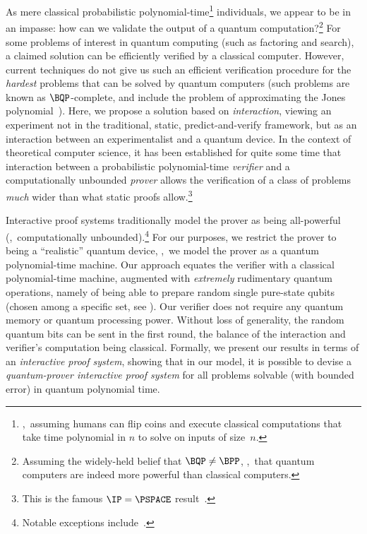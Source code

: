 \documentclass{toc}
\begin{document}
As mere classical probabilistic polynomial-time\footnote{\Ie,~assuming humans can flip coins and execute classical computations that take time polynomial in $n$ to solve on inputs of size~$n$.} individuals, we appear to be in an impasse: how can we validate the output of a quantum computation?\footnote{Assuming the widely-held belief that $\BQP \neq \BPP $, \ie,~that quantum computers are indeed more powerful than classical computers.}
For some problems of interest in quantum computing (such as factoring and search), a claimed solution can be efficiently verified by a classical computer. However, current techniques do not give us such an efficient verification procedure for the \emph{hardest} problems that can be solved by quantum computers (such problems are known as $\BQP$-complete, and include the problem of approximating the Jones polynomial~\cite{AJL06}).
Here, we propose a solution based on \emph{interaction}, viewing an experiment not in the traditional, static, predict-and-verify framework, but as an interaction between an experimentalist and a quantum device.  In the context of theoretical computer science, it has been established for quite some time that interaction between a  probabilistic polynomial-time \emph{verifier} and a computationally unbounded \emph{prover} allows the verification of a class of problems \emph{much} wider than what static proofs allow.\footnote{This is the famous $\IP=\PSPACE$ result~\cite{LFKN90,Sha92}.}


Interactive proof systems traditionally model the prover as being all-powerful (\ie,~computationally unbounded).\footnote{Notable exceptions include~\cite{CL95, GKR08}.} For our purposes, we restrict the prover to being a ``realistic'' quantum device, \ie,~we model the prover as a quantum polynomial-time machine. Our approach equates the verifier with a classical polynomial-time machine, augmented with \emph{extremely} rudimentary quantum operations, namely of being able to prepare random single pure-state qubits (chosen among a specific set, see ). Our verifier does not require any quantum memory or quantum processing power.
Without loss of generality, the random quantum bits can be sent in the first round, the balance of the interaction and verifier's computation being classical.
Formally, we present our results in terms of an \emph{interactive proof system}, showing that in our model, it is possible to devise a
\emph{quantum-prover interactive proof system}
for all problems solvable (with bounded error) in quantum polynomial time.
\end{document}
